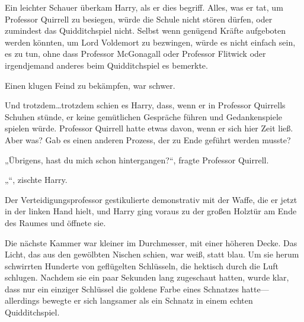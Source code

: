 Ein leichter Schauer überkam Harry, als er dies begriff. Alles, was er tat, um Professor Quirrell zu besiegen, würde die Schule nicht stören dürfen, oder zumindest das Quidditchspiel nicht. Selbst wenn genügend Kräfte aufgeboten werden könnten, um Lord Voldemort zu bezwingen, würde es nicht einfach sein, es zu tun, ohne dass Professor McGonagall oder Professor Flitwick oder irgendjemand anderes beim Quidditchspiel es bemerkte.

Einen klugen Feind zu bekämpfen, war schwer.

Und trotzdem…trotzdem schien es Harry, dass, wenn er in Professor Quirrells Schuhen stünde, er keine gemütlichen Gespräche führen und Gedankenspiele spielen würde. Professor Quirrell hatte etwas davon, wenn er sich hier Zeit ließ. Aber was? Gab es einen anderen Prozess, der zu Ende geführt werden musste?

„Übrigens, hast du mich schon hintergangen?“, fragte Professor Quirrell.

„“, zischte Harry.

Der Verteidigungsprofessor gestikulierte demonstrativ mit der Waffe, die er jetzt in der linken Hand hielt, und Harry ging voraus zu der großen Holztür am Ende des Raumes und öffnete sie.

\later

Die nächste Kammer war kleiner im Durchmesser, mit einer höheren Decke. Das Licht, das aus den gewölbten Nischen schien, war weiß, statt blau.
Um sie herum schwirrten Hunderte von geflügelten Schlüsseln, die hektisch durch die Luft schlugen. Nachdem sie ein paar Sekunden lang zugeschaut hatten, wurde klar, dass nur ein einziger Schlüssel die goldene Farbe eines Schnatzes hatte—allerdings bewegte er sich langsamer als ein Schnatz in einem echten Quidditchspiel.


